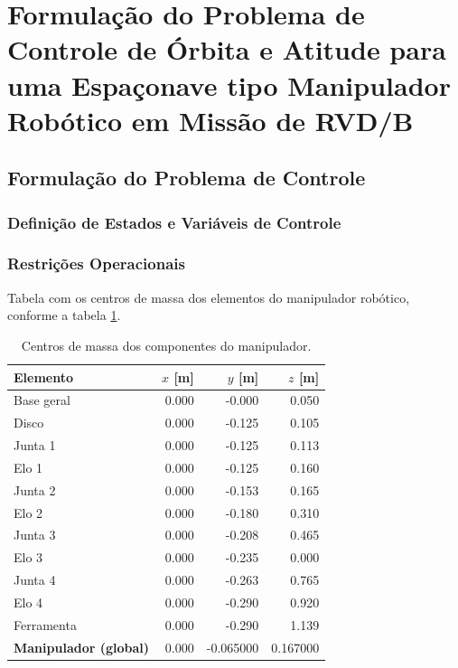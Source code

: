 

\section{Formulação do Problema de Controle de Órbita e Atitude para uma Espaçonave tipo Manipulador Robótico em Missão de RVD/B}


\subsection{Formulação do Problema de Controle}


\subsubsection{Definição de Estados e Variáveis de Controle}


\subsubsection{Restrições Operacionais}

Tabela com os centros de massa dos elementos do manipulador robótico, conforme a tabela \ref{tab:centrosMassa_componentes}.

\begin{table}[h]
\centering
\caption{Centros de massa dos componentes do manipulador.}
\label{tab:centrosMassa_componentes}
\begin{tabular}{lrrr}
\toprule
\textbf{Elemento} & \textbf{$x$ [m]} & \textbf{$y$ [m]} & \textbf{$z$ [m]}\\
\midrule
Base geral              &  0.000 & -0.000 &  0.050 \\
Disco                   &  0.000 & -0.125 &  0.105 \\
Junta 1                 &  0.000 & -0.125 &  0.113 \\
Elo 1                   &  0.000 & -0.125 &  0.160 \\
Junta 2                 &  0.000 & -0.153 &  0.165 \\
Elo 2                   &  0.000 & -0.180 &  0.310 \\
Junta 3                 &  0.000 & -0.208 &  0.465 \\
Elo 3                   &  0.000 & -0.235 &  0.000 \\
Junta 4                 &  0.000 & -0.263 &  0.765 \\
Elo 4                   &  0.000 & -0.290 &  0.920 \\
Ferramenta              &  0.000 & -0.290 &  1.139 \\
\midrule
\textbf{Manipulador (global)} & 0.000 & -0.065000 & 0.167000 \\
\bottomrule
\end{tabular}
\end{table}



